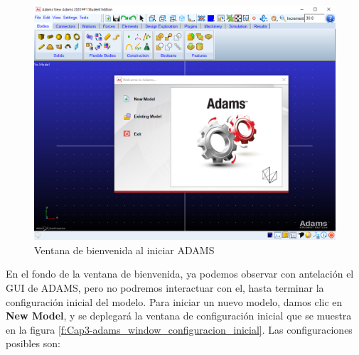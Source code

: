            \begin{figure}[H]
                \centering
                \includegraphics[width=0.7\linewidth]{Main/Chapter3/Images3/adams/Dialogo_Bienvenida.png}
                \caption{Ventana de bienvenida al iniciar ADAMS}
                \label{f:Cap3-adams_window_bienvenida}
            \end{figure} 
            
            En el fondo de la ventana de bienvenida, ya podemos observar con antelación el GUI de ADAMS, pero no podremos interactuar con el, hasta terminar la configuración inicial del modelo.
            Para iniciar un nuevo modelo, damos clic en \textbf{New Model}, y se deplegará la ventana de configuración inicial que se muestra en la figura \ref{f:Cap3-adams_window_configuracion_inicial}. Las configuraciones posibles son:
            
